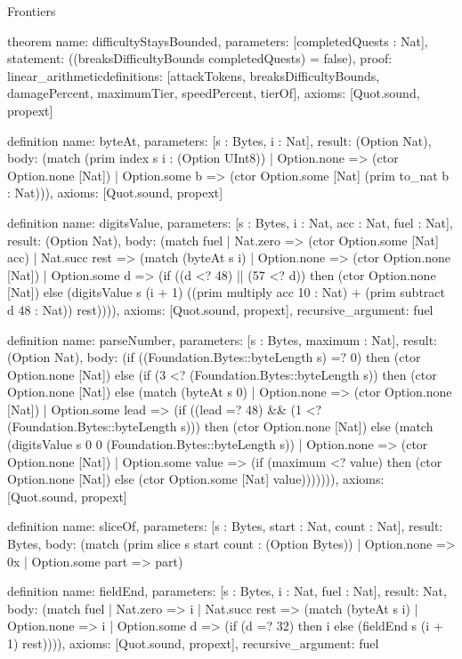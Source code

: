 \begin{lexlean}{Frontiers}
\begin{semanticmodule}
theorem{
  name: difficultyStaysBounded,
  parameters: [completedQuests : Nat],
  statement: ((breaksDifficultyBounds completedQuests) = false),
  proof: linear_arithmetic{definitions: [attackTokens, breaksDifficultyBounds, damagePercent, maximumTier, speedPercent, tierOf]},
  axioms: [Quot.sound, propext]
}

definition{
  name: byteAt,
  parameters: [s : Bytes, i : Nat],
  result: (Option Nat),
  body: (match (prim index s i : (Option UInt8))
    | Option.none => (ctor Option.none [Nat])
    | Option.some b => (ctor Option.some [Nat] (prim to_nat b : Nat))),
  axioms: [Quot.sound, propext]
}

definition{
  name: digitsValue,
  parameters: [s : Bytes, i : Nat, acc : Nat, fuel : Nat],
  result: (Option Nat),
  body: (match fuel
    | Nat.zero => (ctor Option.some [Nat] acc)
    | Nat.succ rest => (match (byteAt s i)
      | Option.none => (ctor Option.none [Nat])
      | Option.some d => (if ((d <? 48) || (57 <? d)) then (ctor Option.none [Nat]) else (digitsValue s (i + 1) ((prim multiply acc 10 : Nat) + (prim subtract d 48 : Nat)) rest)))),
  axioms: [Quot.sound, propext],
  recursive_argument: fuel
}

definition{
  name: parseNumber,
  parameters: [s : Bytes, maximum : Nat],
  result: (Option Nat),
  body: (if ((Foundation.Bytes::byteLength s) =? 0) then (ctor Option.none [Nat]) else (if (3 <? (Foundation.Bytes::byteLength s)) then (ctor Option.none [Nat]) else (match (byteAt s 0)
    | Option.none => (ctor Option.none [Nat])
    | Option.some lead => (if ((lead =? 48) && (1 <? (Foundation.Bytes::byteLength s))) then (ctor Option.none [Nat]) else (match (digitsValue s 0 0 (Foundation.Bytes::byteLength s))
      | Option.none => (ctor Option.none [Nat])
      | Option.some value => (if (maximum <? value) then (ctor Option.none [Nat]) else (ctor Option.some [Nat] value))))))),
  axioms: [Quot.sound, propext]
}

definition{
  name: sliceOf,
  parameters: [s : Bytes, start : Nat, count : Nat],
  result: Bytes,
  body: (match (prim slice s start count : (Option Bytes))
    | Option.none => 0x
    | Option.some part => part)
}

definition{
  name: fieldEnd,
  parameters: [s : Bytes, i : Nat, fuel : Nat],
  result: Nat,
  body: (match fuel
    | Nat.zero => i
    | Nat.succ rest => (match (byteAt s i)
      | Option.none => i
      | Option.some d => (if (d =? 32) then i else (fieldEnd s (i + 1) rest)))),
  axioms: [Quot.sound, propext],
  recursive_argument: fuel
}


\end{semanticmodule}
\end{lexlean}

